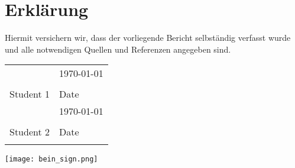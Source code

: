 \section*{Erklärung}

Hiermit versichern wir, dass der vorliegende Bericht selbständig verfasst wurde und alle notwendigen Quellen und Referenzen angegeben sind.

\begin{tabular}{@{}p{2.5in}p{2.5in}@{}}
	\\[5\bigskipamount]
	& \hspace{2mm}\today \\[-15pt]
	\dotfill & \dotfill \\
	Student 1 & Date \\[5\bigskipamount]
	& \hspace{2mm}\today \\[-15pt]
	\dotfill & \dotfill \\
	Student 2 & Date \\
	\centering
\end{tabular} 

\begin{minipage}{0.8\textwidth}
	\vspace{-12.75cm}
	\texttt{[image: bein\_sign.png]}
\end{minipage}